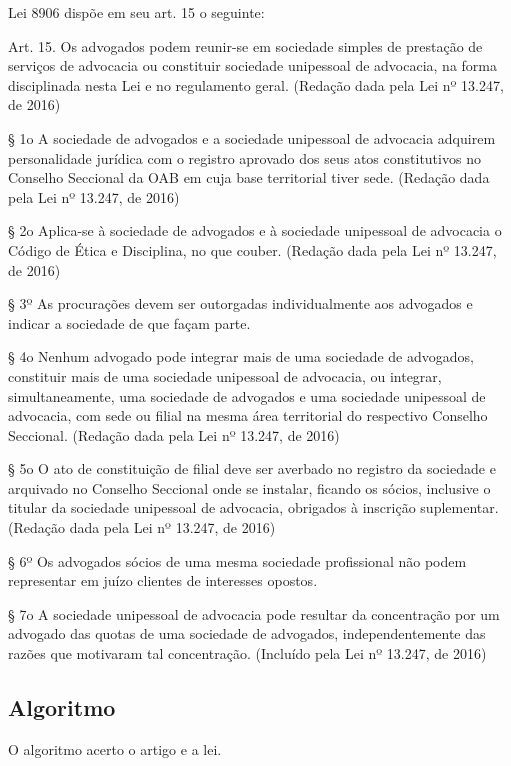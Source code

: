 \documentclass[12pt]{article}
\begin{document}
Lei 8906 dispõe em seu art. 15 o seguinte:

 Art. 15.  Os advogados podem reunir-se em sociedade simples de prestação de serviços de advocacia ou constituir sociedade unipessoal de advocacia, na forma disciplinada nesta Lei e no regulamento geral.          (Redação dada pela Lei nº 13.247, de 2016)


§ 1o  A sociedade de advogados e a sociedade unipessoal de advocacia adquirem personalidade jurídica com o registro aprovado dos seus atos constitutivos no Conselho Seccional da OAB em cuja base territorial tiver sede.           (Redação dada pela Lei nº 13.247, de 2016)

§ 2o  Aplica-se à sociedade de advogados e à sociedade unipessoal de advocacia o Código de Ética e Disciplina, no que couber.           (Redação dada pela Lei nº 13.247, de 2016)

§ 3º As procurações devem ser outorgadas individualmente aos advogados e indicar a sociedade de que façam parte.

§ 4o Nenhum advogado pode integrar mais de uma sociedade de advogados, constituir mais de uma sociedade unipessoal de advocacia, ou integrar, simultaneamente, uma sociedade de advogados e uma sociedade unipessoal de advocacia, com sede ou filial na mesma área territorial do respectivo Conselho Seccional.           (Redação dada pela Lei nº 13.247, de 2016)

§ 5o  O ato de constituição de filial deve ser averbado no registro da sociedade e arquivado no Conselho Seccional onde se instalar, ficando os sócios, inclusive o titular da sociedade unipessoal de advocacia, obrigados à inscrição suplementar.              (Redação dada pela Lei nº 13.247, de 2016)

§ 6º Os advogados sócios de uma mesma sociedade profissional não podem representar em juízo clientes de interesses opostos.

§ 7o  A sociedade unipessoal de advocacia pode resultar da concentração por um advogado das quotas de uma sociedade de advogados, independentemente das razões que motivaram tal concentração.             (Incluído pela Lei nº 13.247, de 2016)

\subsection{Algoritmo}

O algoritmo acerto o artigo e a lei.
\end{document}
